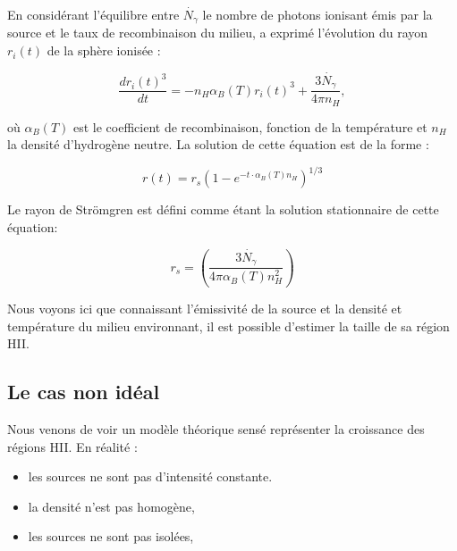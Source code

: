 En considérant l'équilibre entre $\dot{N_\gamma}$ le nombre de photons ionisant émis par la source et le taux de recombinaison du milieu, \cite{stromgren_physical_1939} a exprimé l'évolution du rayon  $r_i(t)$ de la sphère ionisée :

\begin{equation}
\frac{dr_i(t)^3}{dt} = -n_H \alpha_B(T)r_i (t)^3 + \frac{3 \dot{N_\gamma} }{4 \pi n_H},
\end{equation}

où $\alpha_B(T)$ est le coefficient de recombinaison, fonction de la température et $n_H$ la densité d'hydrogène neutre.
La solution de cette équation est de la forme :

\begin{equation}
r(t) = r_s \left( 1 - e^{-t\cdot \alpha_B(T) n_H } \right)^{1/3}
\end{equation}

%

Le rayon de Strömgren est défini comme étant la solution stationnaire de cette équation:

\begin{equation}
r_s = \left( \frac{3 \dot{N_\gamma} }{4 \pi \alpha_B(T) n_H^2} \right)
\end{equation}

Nous voyons ici que connaissant l'émissivité de la source et la densité et température du milieu environnant, il est possible d'estimer la taille de sa région HII.

\subsection{Le cas non idéal}
Nous venons de voir un modèle théorique sensé représenter la croissance des régions HII.
En réalité : 
\begin{itemize}
\item les sources ne sont pas d'intensité constante. %
\item la densité n'est pas homogène,%
\item les sources ne sont pas isolées,
\end{itemize}


